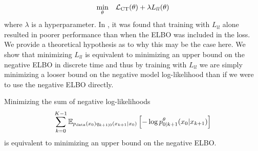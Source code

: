 \documentclass{article}
\begin{document}
\begin{equation}
    \underset{\theta}{\text{min}} \quad \mathcal{L}_{\textup{CT}}(\theta) + \lambda L_{ll}(\theta)
\end{equation}
where $\lambda$ is a hyperparameter. In \cite{austin2021structured}, it was found that training with $L_{ll}$ alone resulted in poorer performance than when the ELBO was included in the loss. We provide a theoretical hypothesis as to why this may be the case here. We show that minimizing $L_{ll}$ is equivalent to minimizing an upper bound on the negative ELBO in discrete time and thus by training with $L_{ll}$ we are simply minimizing a looser bound on the negative model log-likelihood than if we were to use the negative ELBO directly.



\begin{proposition}
Minimizing the sum of negative log-likelihoods
\begin{equation}
 \sum_{k=0}^{K-1} \mathbb{E}_{p_{\textup{data}}(x_0) q_{k+1|0}(x_{k+1} | x_0)} \left[ - \log p_{0|k+1}^\theta(x_0 | x_{k+1}) \right]
\end{equation}
is equivalent to minimizing an upper bound on the negative ELBO.
\end{proposition}
\end{document}
